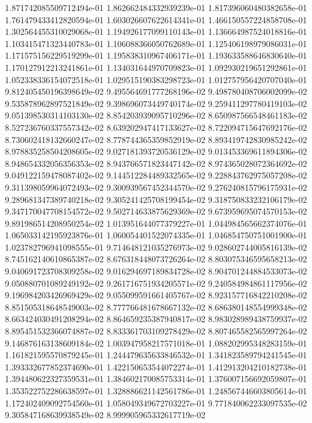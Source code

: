 1.871742085509712494e-01
1.862662484332939239e-01
1.817396060480382658e-01
1.761479433412820594e-01
1.603026607622614341e-01
1.466150557224858708e-01
1.302564455310029068e-01
1.194926177099110143e-01
1.136664987524018816e-01
1.103415471323440783e-01
1.106088366050762689e-01
1.125406198979086031e-01
1.171575156229519299e-01
1.195838310967406171e-01
1.193633588646830640e-01
1.170127912213241861e-01
1.134031644970709823e-01
1.092930219651292861e-01
1.052338336154072518e-01
1.029515190383298723e-01
1.012757956420707040e-01
9.812405450196398649e-02
9.495564691777268196e-02
9.498780408706002099e-02
9.535878962897521849e-02
9.398696073449740174e-02
9.259411297780419103e-02
9.051398530314103130e-02
8.854203939095710296e-02
8.650987566548461183e-02
8.527236760337557342e-02
8.639202947417133627e-02
8.722094715647692176e-02
8.730602418132660247e-02
8.778744365359852919e-02
8.893419742830985242e-02
8.978835258504208605e-02
9.027181393720536129e-02
9.013453369611894306e-02
8.948654332056356353e-02
8.943766571823447142e-02
8.974365028072364692e-02
9.049122159478087402e-02
9.144512284489332565e-02
9.228843762975057208e-02
9.311398059964072493e-02
9.300939567452344570e-02
9.276240815796175931e-02
9.289681347389740218e-02
9.305241425708199454e-02
9.318750833232106179e-02
9.347170047708154572e-02
9.502714633875629369e-02
9.673959695074570153e-02
9.891986514208950254e-02
1.013951644077379227e-01
1.044984565662374076e-01
1.065033142195923876e-01
1.060054401522074335e-01
1.046854750751001900e-01
1.023782796941098555e-01
9.714648121035276973e-02
9.028602744005816139e-02
8.745162140610865387e-02
8.676318448073726264e-02
8.803075346595658213e-02
9.040691723708309258e-02
9.016294697189834728e-02
8.904701244884533073e-02
9.050880701089249192e-02
9.261716751934205571e-02
9.240584984861117956e-02
9.196984203426969429e-02
9.055099591661405767e-02
8.923157716842210208e-02
8.851505318648549003e-02
8.777766481678667132e-02
8.686380148554999348e-02
8.663424030491208294e-02
8.864659235387940817e-02
8.983028989438759937e-02
8.895451532366074887e-02
8.833361703109278429e-02
8.807465582565997264e-02
9.146876163138609184e-02
1.003947958217571018e-01
1.088202995348283159e-01
1.161821595570879245e-01
1.244479635633846532e-01
1.341823589794241545e-01
1.393332677852374690e-01
1.422150653544072274e-01
1.412913204210182738e-01
1.394480622327359531e-01
1.384602170085753314e-01
1.376007156692059807e-01
1.353522752286638597e-01
1.328886621142561786e-01
1.248567446603805614e-01
1.172402409092754560e-01
1.058049349672703227e-01
9.771840062233097535e-02
9.305847168639938549e-02
8.999905965332617719e-02

